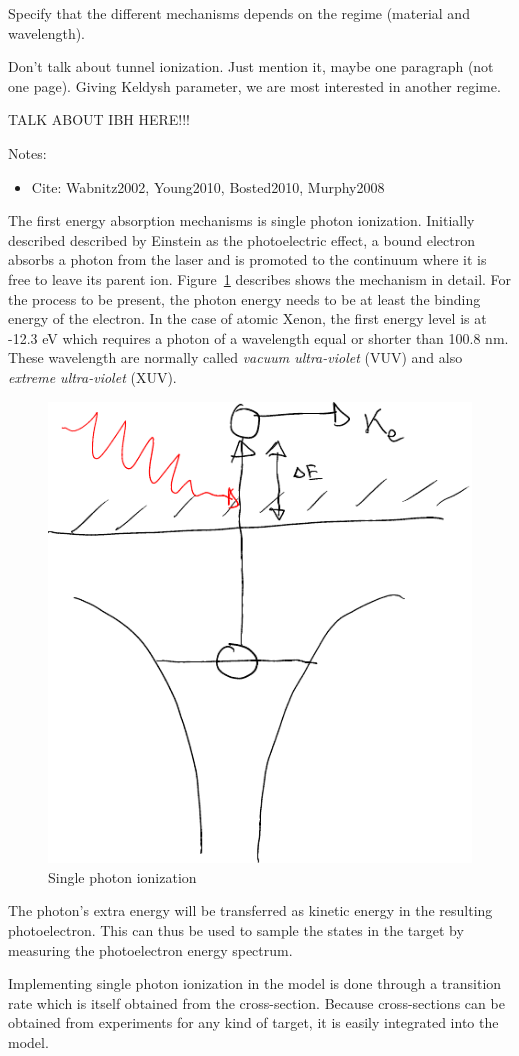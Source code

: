 Specify that the different mechanisms depends on the regime (material and
wavelength).

Don't talk about tunnel ionization. Just mention it, maybe one paragraph (not
one page). Giving Keldysh parameter, we are most interested in another regime.

TALK ABOUT IBH HERE!!!


Notes:
\begin{itemize}
\item Cite: Wabnitz2002, Young2010, Bosted2010, Murphy2008
\end{itemize}

The first energy absorption mechanisms is single photon ionization. Initially
described described by Einstein as the photoelectric effect, a bound electron
absorbs a photon from the laser and is promoted to the continuum where it is
free to leave its parent ion. Figure~\ref{fig:ionization:single} describes
shows the mechanism in detail. For the process to be present, the photon energy
needs to be at least the binding energy of the electron. In the case of
atomic Xenon, the first energy level is at -12.3 eV which requires a photon
of a wavelength equal or shorter than 100.8 nm. These wavelength are normally
called \textit{vacuum ultra-violet} (VUV) and also \textit{extreme
ultra-violet} (XUV).

\begin{figure}
 \centering
 \includegraphics[width=0.38\columnwidth]{figures/mockups/ionization_single}
 \caption{Single photon ionization}
 \label{fig:ionization:single}
\end{figure}


The photon's extra energy will be transferred as kinetic energy in the
resulting photoelectron. This can thus be used to sample the states in the
target by measuring the photoelectron energy spectrum.

Implementing single photon ionization in the model is done through a
transition rate which is itself obtained from the cross-section. Because
cross-sections can be obtained from experiments for any kind of target, it is
easily integrated into the model.

